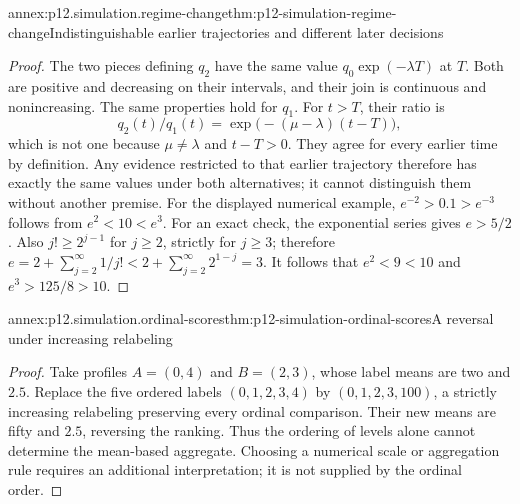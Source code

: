 \begin{annexitem}{annex:p12.simulation.regime-change}{thm:p12-simulation-regime-change}{Indistinguishable earlier trajectories and different later decisions}
\begin{proof}
The two pieces defining \(q_2\) have the same value
\(q_0\exp(-\lambda T)\) at \(T\). Both are positive and
decreasing on their intervals, and their join is continuous and
nonincreasing. The same properties hold for \(q_1\).
For \(t>T\), their ratio is
\[
 q_2(t)/q_1(t)=\exp\bigl(- (\mu-\lambda)(t-T)\bigr),
\]
which is not one because \(\mu\ne\lambda\) and \(t-T>0\).
They agree for every earlier time by definition. Any evidence
restricted to that earlier trajectory therefore has exactly the
same values under both alternatives; it cannot distinguish them
without another premise. For the displayed numerical example,
\(e^{-2}>0.1>e^{-3}\) follows from \(e^2<10<e^3\).
For an exact check, the exponential series gives \(e>5/2\).
Also \(j!\geq2^{j-1}\) for \(j\geq2\), strictly for
\(j\geq3\); therefore
\(e=2+\sum_{j=2}^\infty1/j!<2+\sum_{j=2}^\infty2^{1-j}=3\).
It follows that \(e^2<9<10\) and \(e^3>125/8>10\).
\end{proof}
\end{annexitem}

\begin{annexitem}{annex:p12.simulation.ordinal-scores}{thm:p12-simulation-ordinal-scores}{A reversal under increasing relabeling}
\begin{proof}
Take profiles \(A=(0,4)\) and \(B=(2,3)\), whose label means
are two and \(2.5\). Replace the five ordered labels
\((0,1,2,3,4)\) by \((0,1,2,3,100)\), a strictly increasing
relabeling preserving every ordinal comparison. Their new means
are fifty and \(2.5\), reversing the ranking. Thus the ordering
of levels alone cannot determine the mean-based aggregate.
Choosing a numerical scale or aggregation rule requires an
additional interpretation; it is not supplied by the ordinal order.
\end{proof}
\end{annexitem}
